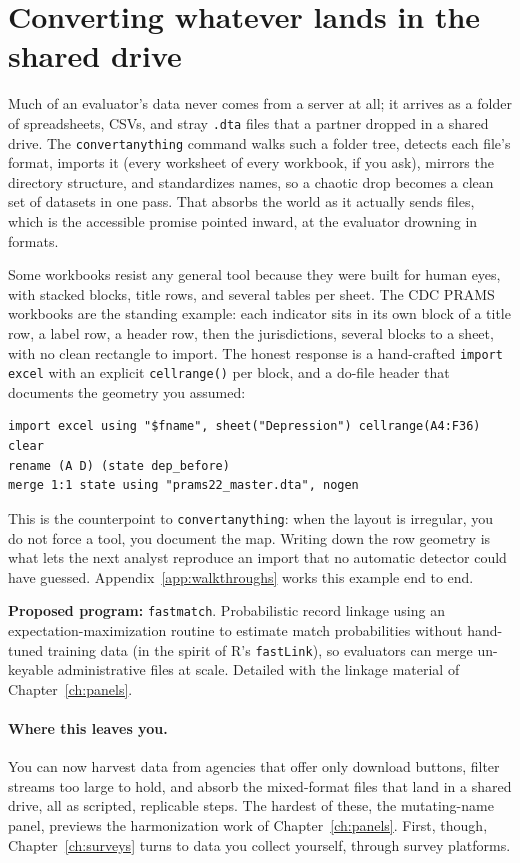 \documentclass[
    a4paper,
    fontsize=10pt,
    twoside=true,
    numbers=noenddot,
]{kaobook}
\begin{document}
\section{Converting whatever lands in the shared drive}
Much of an evaluator's data never comes from a server at all; it arrives as a folder of spreadsheets, CSVs, and stray \texttt{.dta} files that a partner dropped in a shared drive. The \texttt{convertanything} command walks such a folder tree, detects each file's format, imports it (every worksheet of every workbook, if you ask), mirrors the directory structure, and standardizes names, so a chaotic drop becomes a clean set of datasets in one pass. That absorbs the world as it actually sends files, which is the accessible promise pointed inward, at the evaluator drowning in formats.

Some workbooks resist any general tool because they were built for human eyes, with stacked blocks, title rows, and several tables per sheet. The CDC PRAMS workbooks are the standing example: each indicator sits in its own block of a title row, a label row, a header row, then the jurisdictions, several blocks to a sheet, with no clean rectangle to import. The honest response is a hand-crafted \texttt{import excel} with an explicit \texttt{cellrange()} per block, and a do-file header that documents the geometry you assumed:
{\footnotesize
\begin{verbatim}
import excel using "$fname", sheet("Depression") cellrange(A4:F36) clear
rename (A D) (state dep_before)
merge 1:1 state using "prams22_master.dta", nogen
\end{verbatim}
}
This is the counterpoint to \texttt{convertanything}: when the layout is irregular, you do not force a tool, you document the map. Writing down the row geometry is what lets the next analyst reproduce an import that no automatic detector could have guessed. Appendix~\ref{app:walkthroughs} works this example end to end.

\begin{kaobox}[frametitle=Ado-file Idea: \texttt{fastmatch}]
\textbf{Proposed program:} \texttt{fastmatch}. Probabilistic record linkage using an expectation-maximization routine to estimate match probabilities without hand-tuned training data (in the spirit of R's \texttt{fastLink}), so evaluators can merge un-keyable administrative files at scale. Detailed with the linkage material of Chapter~\ref{ch:panels}.
\end{kaobox}

\paragraph{Where this leaves you.} You can now harvest data from agencies that offer only download buttons, filter streams too large to hold, and absorb the mixed-format files that land in a shared drive, all as scripted, replicable steps. The hardest of these, the mutating-name panel, previews the harmonization work of Chapter~\ref{ch:panels}. First, though, Chapter~\ref{ch:surveys} turns to data you collect yourself, through survey platforms.
\end{document}
